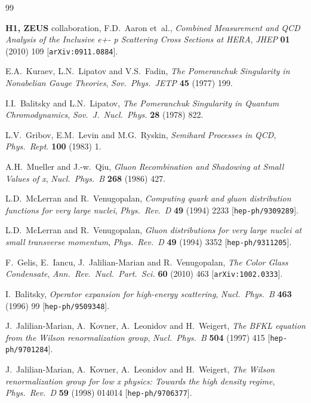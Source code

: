 \documentclass[11pt,a4paper]{article}
\numberwithin{equation}{section}
\begin{document}
\begin{thebibliography}{99}
\small

{\bf H1, ZEUS} collaboration, F.D.~Aaron et~al., \emph{Combined Measurement and QCD Analysis
of the Inclusive e+- p Scattering Cross Sections at HERA}, \emph{JHEP} {\bf 01} (2010) 109
[\texttt{arXiv:0911.0884}].

E.A.~Kuraev, L.N.~Lipatov and V.S.~Fadin, \emph{The Pomeranchuk Singularity in Nonabelian
Gauge Theories}, \emph{Sov.\ Phys.\ JETP} {\bf 45} (1977) 199.

I.I.~Balitsky and L.N.~Lipatov, \emph{The Pomeranchuk Singularity in Quantum
Chromodynamics}, \emph{Sov.\ J.\ Nucl.\ Phys.} {\bf 28} (1978) 822.

L.V.~Gribov, E.M.~Levin and M.G.~Ryskin, \emph{Semihard Processes in QCD}, \emph{Phys.\
Rept.} {\bf 100} (1983) 1.

A.H.~Mueller and J.-w.~Qiu, \emph{Gluon Recombination and Shadowing at Small Values of x},
\emph{Nucl.\ Phys.\ B} {\bf 268} (1986) 427.

L.D.~McLerran and R.~Venugopalan, \emph{Computing quark and gluon distribution functions for
very large nuclei}, \emph{Phys.\ Rev.\ D} {\bf 49} (1994) 2233 [\texttt{hep-ph/9309289}].

L.D.~McLerran and R.~Venugopalan, \emph{Gluon distributions for very large nuclei at small
transverse momentum}, \emph{Phys.\ Rev.\ D} {\bf 49} (1994) 3352 [\texttt{hep-ph/9311205}].

F.~Gelis, E.~Iancu, J.~Jalilian-Marian and R.~Venugopalan, \emph{The Color Glass Condensate},
\emph{Ann.\ Rev.\ Nucl.\ Part.\ Sci.} {\bf 60} (2010) 463 [\texttt{arXiv:1002.0333}].

I.~Balitsky, \emph{Operator expansion for high-energy scattering}, \emph{Nucl.\ Phys.\ B}
{\bf 463} (1996) 99 [\texttt{hep-ph/9509348}].

J.~Jalilian-Marian, A.~Kovner, A.~Leonidov and H.~Weigert, \emph{The BFKL equation from the
Wilson renormalization group}, \emph{Nucl.\ Phys.\ B} {\bf 504} (1997) 415
[\texttt{hep-ph/9701284}].

J.~Jalilian-Marian, A.~Kovner, A.~Leonidov and H.~Weigert, \emph{The Wilson renormalization
group for low x physics: Towards the high density regime}, \emph{Phys.\ Rev.\ D} {\bf 59}
(1998) 014014 [\texttt{hep-ph/9706377}].


\end{thebibliography}
\end{document}
